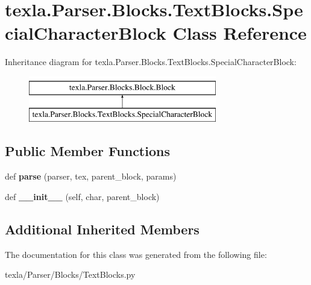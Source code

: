\hypertarget{classtexla_1_1Parser_1_1Blocks_1_1TextBlocks_1_1SpecialCharacterBlock}{}\section{texla.\+Parser.\+Blocks.\+Text\+Blocks.\+Special\+Character\+Block Class Reference}
\label{classtexla_1_1Parser_1_1Blocks_1_1TextBlocks_1_1SpecialCharacterBlock}
Inheritance diagram for texla.\+Parser.\+Blocks.\+Text\+Blocks.\+Special\+Character\+Block\+:\begin{figure}[H]
\begin{center}
\leavevmode
\includegraphics[height=2.000000cm]{classtexla_1_1Parser_1_1Blocks_1_1TextBlocks_1_1SpecialCharacterBlock}
\end{center}
\end{figure}
\subsection*{Public Member Functions}
\begin{DoxyCompactItemize}
\item 
\hypertarget{classtexla_1_1Parser_1_1Blocks_1_1TextBlocks_1_1SpecialCharacterBlock_ac516c028be490e1d7847b444f01d4535}{}\label{classtexla_1_1Parser_1_1Blocks_1_1TextBlocks_1_1SpecialCharacterBlock_ac516c028be490e1d7847b444f01d4535} 
def {\bfseries parse} (parser, tex, parent\+\_\+block, params)
\item 
\hypertarget{classtexla_1_1Parser_1_1Blocks_1_1TextBlocks_1_1SpecialCharacterBlock_a604dc98797d6f269ab5c40612be08bec}{}\label{classtexla_1_1Parser_1_1Blocks_1_1TextBlocks_1_1SpecialCharacterBlock_a604dc98797d6f269ab5c40612be08bec} 
def {\bfseries \+\_\+\+\_\+init\+\_\+\+\_\+} (self, char, parent\+\_\+block)
\end{DoxyCompactItemize}
\subsection*{Additional Inherited Members}


The documentation for this class was generated from the following file\+:\begin{DoxyCompactItemize}
\item 
texla/\+Parser/\+Blocks/Text\+Blocks.\+py\end{DoxyCompactItemize}
